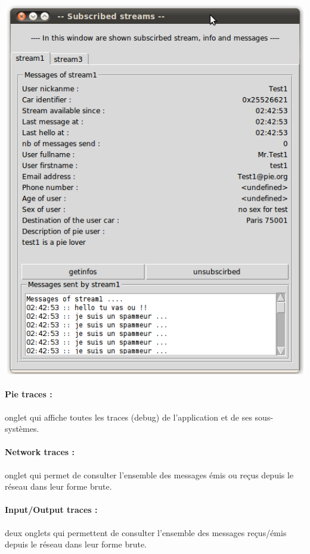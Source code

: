 \begin{center}
    \includegraphics[scale=0.5]{img/subscribed.png}
\end{center}


\paragraph{Pie traces :}
onglet qui affiche toutes les traces (debug) de l'application et de ses sous-systèmes.


\paragraph{Network traces :} onglet qui permet de consulter l'ensemble des messages émis ou reçus depuis le réseau dans leur forme brute.


\paragraph{Input/Output traces :} deux onglets qui permettent de consulter l'ensemble des messages reçus/émis depuis le réseau dans leur forme brute.


